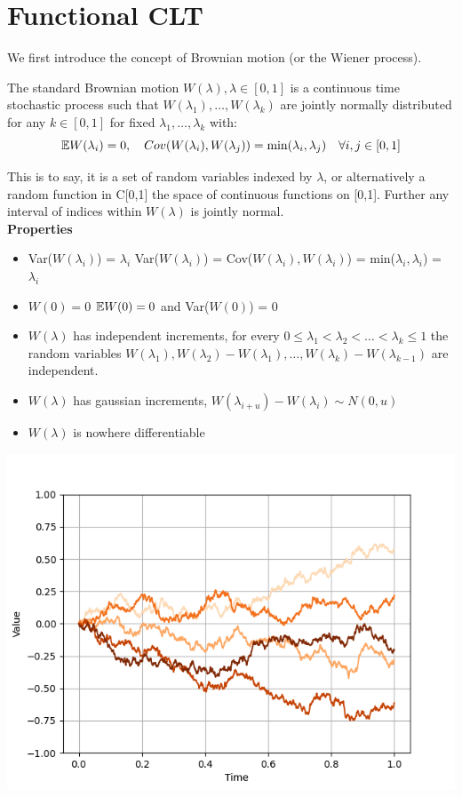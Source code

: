 \documentclass[DIV=14,titlepage=false]{scrreprt}
\begin{document}
\section{Functional CLT}
We first introduce the concept of Brownian motion (or the Wiener process). 

\begin{definition}
    The standard Brownian motion $W(\lambda), \lambda \in [0,1]$ is a continuous time stochastic process such that $W(\lambda_1), \dots, W(\lambda_k)$ are jointly normally distributed for any $k \in [0,1]$ for fixed $\lambda_1, \dots, \lambda_k$ with:
    \[ \mathbb{E} W(\lambda_i) = 0, \quad Cov(W(\lambda_i), W(\lambda_j)) = \min(\lambda_i, \lambda_j) \quad \forall i,j \in [0,1]\]
\end{definition}
This is to say, it is a set of random variables indexed by $\lambda$, or alternatively a random function in C[0,1] the space of continuous functions on [0,1]. Further any interval of indices within $W(\lambda)$ is jointly normal.\\
\textbf{Properties}
\begin{itemize}
    \item Var($W(\lambda_i)$) = $\lambda_i$
    \subitem Var($W(\lambda_i)$) = Cov($W(\lambda_i), W(\lambda_i)$) = min($\lambda_i, \lambda_i$) = $\lambda_i$
    \item $W(0) = 0$
    \subitem $\mathbb{E} W(0) = 0$ and Var($W(0)$) = 0
    \item $W(\lambda)$ has independent increments, for every $0\leq \lambda_1 < \lambda_2 < \dots < \lambda_k \leq 1$ the random variables $W(\lambda_1), W(\lambda_2) - W(\lambda_1), \dots, W(\lambda_k) - W(\lambda_{k-1})$ are independent.
    \item $W(\lambda)$ has gaussian increments, $W(\lambda_{i+u}) - W(\lambda_i) \sim N(0, u)$
    \item $W(\lambda)$ is nowhere differentiable
\end{itemize}
\includegraphics[width=\textwidth]{./Images/BrownianMotion.png}
\end{document}
